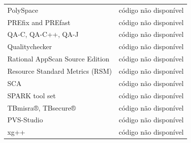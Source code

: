 \documentclass[qual, classic, a4paper]{ufbathesis}
\begin{document}
\begin{table}
\begin{tabular}{| l | l |}
PolySpace                 & código não disponível \\
PREfix and PREfast        & código não disponivel \\
QA-C, QA-C++, QA-J        & código não disponível \\
Qualitychecker            & código não disponível \\
Rational AppScan Source Edition & código não disponível \\
Resource Standard Metrics (RSM) & código não disponível \\
SCA                       & código não disponível \\
SPARK tool set            & código não disponível \\
TBmisra®, TBsecure®       & código não disponível \\
PVS-Studio                & código não disponível \\
xg++                      & código não disponível \\
\hline
\end{tabular}
\label{ferramentas-do-nist-sem-codigo}
\end{table}
\end{document}
